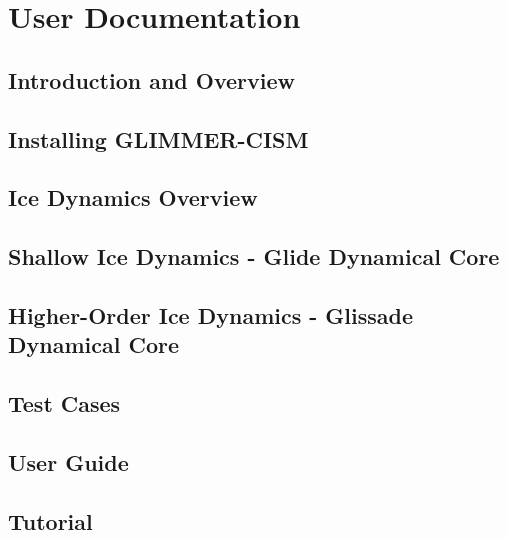 \mainmatter
\part{User Documentation}

\chapter{Introduction and Overview}
\newcommand{\dir}{intro}


\chapter{Installing GLIMMER-CISM}
\renewcommand{\dir}{install}


\chapter{Ice Dynamics Overview}
\renewcommand{\dir}{dynamics-overview}


\chapter{Shallow Ice Dynamics - Glide Dynamical Core}
\renewcommand{\dir}{shallow-ice}


\chapter{Higher-Order Ice Dynamics - Glissade Dynamical Core}
\renewcommand{\dir}{higher-order}


\chapter{Test Cases}
\renewcommand{\dir}{tests}



\chapter{User Guide}
\renewcommand{\dir}{ug}


\chapter{Tutorial}
\renewcommand{\dir}{tut}


